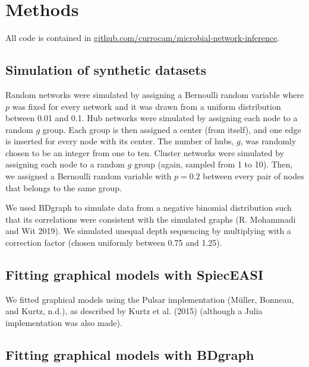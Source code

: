 \documentclass[
  a4paper,
]{article}
\begin{document}
\hypertarget{methods}{%
\section{Methods}\label{methods}}

All code is contained in
\href{https://github.com/currocam/microbial-network-inference}{github.com/currocam/microbial-network-inference}.

\hypertarget{simulation-of-synthetic-datasets}{%
\subsection{Simulation of synthetic
datasets}\label{simulation-of-synthetic-datasets}}

Random networks were simulated by assigning a Bernoulli random variable
where \(p\) was fixed for every network and it was drawn from a uniform
distribution between 0.01 and 0.1. Hub networks were simulated by
assigning each node to a random \(g\) group. Each group is then assigned
a center (from itself), and one edge is inserted for every node with its
center. The number of hubs, \(g\), was randomly chosen to be an integer
from one to ten. Cluster networks were simulated by assigning each node
to a random \(g\) group (again, sampled from 1 to 10). Then, we assigned
a Bernoulli random variable with \(p=0.2\) between every pair of nodes
that belongs to the same group.

We used BDgraph to simulate data from a negative binomial distribution
such that its correlations were consistent with the simulated graphs (R.
Mohammadi and Wit 2019). We simulated unequal depth sequencing by
multiplying with a correction factor (chosen uniformly between 0.75 and
1.25).

\hypertarget{fitting-graphical-models-with-spieceasi}{%
\subsection{Fitting graphical models with
SpiecEASI}\label{fitting-graphical-models-with-spieceasi}}

We fitted graphical models using the Pulsar implementation (Müller,
Bonneau, and Kurtz, n.d.), as described by Kurtz et al. (2015) (although
a Julia implementation was also made).

\hypertarget{fitting-graphical-models-with-bdgraph}{%
\subsection{Fitting graphical models with
BDgraph}\label{fitting-graphical-models-with-bdgraph}}
\end{document}
